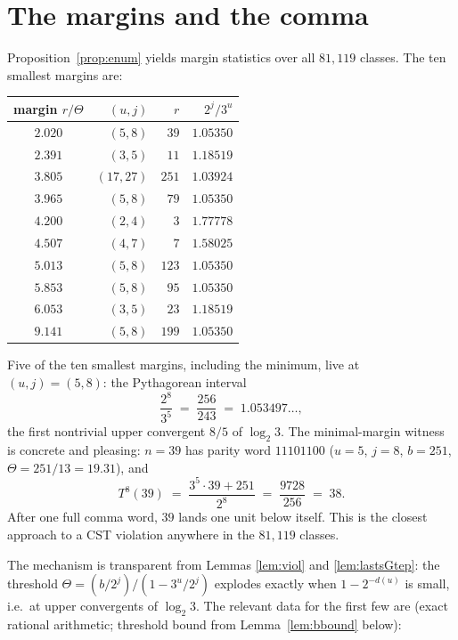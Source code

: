 \documentclass[10pt]{article}
\theoremstyle{definition}
\theoremstyle{remark}
\newcommand{\lb}{\log_2 3}
\begin{document}
\section{The margins and the comma}\label{sec:comma}

Proposition~\ref{prop:enum} yields margin statistics over all $81{,}119$
classes. The ten smallest margins are:

\begin{center}
\begin{tabular}{crrr}
\hline
margin $r/\Theta$ & $(u,j)$ & $r$ & $2^{j}/3^{u}$ \\
\hline
$2.020$ & $(5,8)$   & $39$  & $1.05350$ \\
$2.391$ & $(3,5)$   & $11$  & $1.18519$ \\
$3.805$ & $(17,27)$ & $251$ & $1.03924$ \\
$3.965$ & $(5,8)$   & $79$  & $1.05350$ \\
$4.200$ & $(2,4)$   & $3$   & $1.77778$ \\
$4.507$ & $(4,7)$   & $7$   & $1.58025$ \\
$5.013$ & $(5,8)$   & $123$ & $1.05350$ \\
$5.853$ & $(5,8)$   & $95$  & $1.05350$ \\
$6.053$ & $(3,5)$   & $23$  & $1.18519$ \\
$9.141$ & $(5,8)$   & $199$ & $1.05350$ \\
\hline
\end{tabular}
\end{center}

Five of the ten smallest margins, including the minimum, live at
$(u,j) = (5,8)$: the Pythagorean interval
\[
\frac{2^{8}}{3^{5}} \;=\; \frac{256}{243} \;=\; 1.053497\ldots,
\]
the first nontrivial upper convergent $8/5$ of $\lb$. The minimal-margin
witness is concrete and pleasing: $n = 39$ has parity word $11101100$
($u=5$, $j=8$, $b=251$, $\Theta = 251/13 = 19.31$), and
\[
T^{8}(39) \;=\; \frac{3^{5}\cdot 39 + 251}{2^{8}} \;=\; \frac{9728}{256}
\;=\; 38.
\]
After one full comma word, $39$ lands one unit below itself. This is the
closest approach to a CST violation anywhere in the $81{,}119$ classes.

The mechanism is transparent from Lemmas \ref{lem:viol} and
\ref{lem:lastsGtep}: the threshold
$\Theta = (b/2^{j}) / (1 - 3^{u}/2^{j})$ explodes exactly when
$1 - 2^{-d(u)}$ is small, i.e.\ at upper convergents of $\lb$. The relevant
data for the first few are (exact rational arithmetic; threshold bound from
Lemma~\ref{lem:bbound} below):
\end{document}

